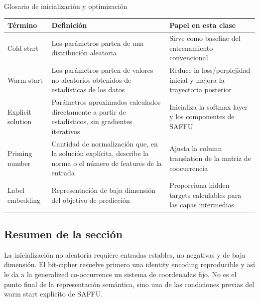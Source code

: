 \begin{knowledgebox}{Glosario de inicialización y optimización}
\begin{tabularx}{\textwidth}{L{0.18\textwidth} L{0.27\textwidth} X}
\toprule
Término & Definición & Papel en esta clase \\
\midrule
Cold start & Los parámetros parten de una distribución aleatoria & Sirve como baseline del entrenamiento convencional \\
Warm start & Los parámetros parten de valores no aleatorios obtenidos de estadísticas de los datos & Reduce la loss/perplejidad inicial y mejora la trayectoria posterior \\
Explicit solution & Parámetros aproximados calculados directamente a partir de estadísticos, sin gradientes iterativos & Inicializa la softmax layer y los componentes de SAFFU \\
Priming number & Cantidad de normalización que, en la solución explícita, describe la norma o el número de features de la entrada & Ajusta la column translation de la matriz de coocurrencia \\
Label embedding & Representación de baja dimensión del objetivo de predicción & Proporciona hidden targets calculables para las capas intermedias \\
\bottomrule
\end{tabularx}
\end{knowledgebox}

\subsection{Resumen de la sección}

La inicialización no aleatoria requiere entradas estables, no negativas y de baja dimensión. El bit-cipher resuelve primero una identity encoding reproducible y así le da a la generalized co-occurrence un sistema de coordenadas fijo. No es el punto final de la representación semántica, sino una de las condiciones previas del warm start explícito de SAFFU.
